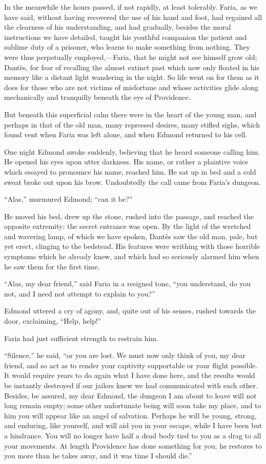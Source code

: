 In the meanwhile the hours passed, if not rapidly, at least tolerably.
Faria, as we have said, without having recovered the use of his hand
and foot, had regained all the clearness of his understanding, and had
gradually, besides the moral instructions we have detailed, taught his
youthful companion the patient and sublime duty of a prisoner, who
learns to make something from nothing. They were thus perpetually
employed,—Faria, that he might not see himself grow old; Dantès, for
fear of recalling the almost extinct past which now only floated in his
memory like a distant light wandering in the night. So life went on for
them as it does for those who are not victims of misfortune and whose
activities glide along mechanically and tranquilly beneath the eye of
Providence.

But beneath this superficial calm there were in the heart of the young
man, and perhaps in that of the old man, many repressed desires, many
stifled sighs, which found vent when Faria was left alone, and when
Edmond returned to his cell.

One night Edmond awoke suddenly, believing that he heard someone
calling him. He opened his eyes upon utter darkness. His name, or
rather a plaintive voice which essayed to pronounce his name, reached
him. He sat up in bed and a cold sweat broke out upon his brow.
Undoubtedly the call came from Faria’s dungeon.

“Alas,” murmured Edmond; “can it be?”

He moved his bed, drew up the stone, rushed into the passage, and
reached the opposite extremity; the secret entrance was open. By the
light of the wretched and wavering lamp, of which we have spoken,
Dantès saw the old man, pale, but yet erect, clinging to the bedstead.
His features were writhing with those horrible symptoms which he
already knew, and which had so seriously alarmed him when he saw them
for the first time.

“Alas, my dear friend,” said Faria in a resigned tone, “you understand,
do you not, and I need not attempt to explain to you?”

Edmond uttered a cry of agony, and, quite out of his senses, rushed
towards the door, exclaiming, “Help, help!”

Faria had just sufficient strength to restrain him.

“Silence,” he said, “or you are lost. We must now only think of you, my
dear friend, and so act as to render your captivity supportable or your
flight possible. It would require years to do again what I have done
here, and the results would be instantly destroyed if our jailers knew
we had communicated with each other. Besides, be assured, my dear
Edmond, the dungeon I am about to leave will not long remain empty;
some other unfortunate being will soon take my place, and to him you
will appear like an angel of salvation. Perhaps he will be young,
strong, and enduring, like yourself, and will aid you in your escape,
while I have been but a hindrance. You will no longer have half a dead
body tied to you as a drag to all your movements. At length Providence
has done something for you; he restores to you more than he takes away,
and it was time I should die.”

